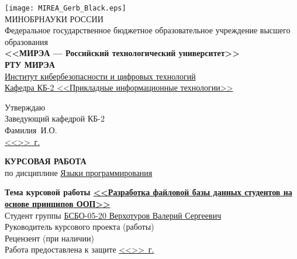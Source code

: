 \documentclass[14pt, a4paper, titlepage]{extarticle}
\begin{document}
\begin{titlepage}
    \pagestyle{empty}
    \newcommand\signaturePlace{\uline{\hspace{3cm}}}
    \newcommand\datePlace{\mbox{\uline{<<\qquad>>\hspace{2cm}\the\year{}~г.}}}
    \begin{center}
        \texttt{[image: MIREA\_Gerb\_Black.eps]} \\
        МИНОБРНАУКИ РОССИИ \\ 
        Федеральное государственное бюджетное образовательное учреждение высшего образования \\
        \textbf{<<МИРЭА --- Российский технологический университет>>} \\
        \textbf{\fontsize{16pt}{16pt}\selectfont{}РТУ МИРЭА} \\
        \uline{Институт кибербезопасности и цифровых технологий} \\
        \uline{Кафедра КБ-2 <<Прикладные информационные технологии>>} \\
        \begin{flushright}
            \begin{minipage}{.5\textwidth}
                \centering
                Утверждаю \\
                Заведующий кафедрой КБ-2 \\
                Фамилия~И.О. \signaturePlace \\
                \datePlace
            \end{minipage}
        \end{flushright}
        {\fontsize{16pt}{16pt}\selectfont
        \textbf{КУРСОВАЯ РАБОТА}} \\
        по дисциплине \uline{Языки программирования}
    \end{center}
    \textbf{Тема курсовой работы \uline{<<Разработка файловой базы данных студентов на основе принципов ООП>>}} \bigskip\\
    Студент группы \uline{БСБО-05-20 Верхотуров Валерий Сергеевич} \hfill\signaturePlace \bigskip\\
    Руководитель курсового проекта (работы) \uline{\hspace{4cm}} \hfill\signaturePlace \bigskip\\
    Рецензент (при наличии) \uline{\hspace{7.7cm}} \hfill\signaturePlace \bigskip\\
    Работа предоставлена к защите \hfill\datePlace \bigskip\\

\end{titlepage}
\end{document}
